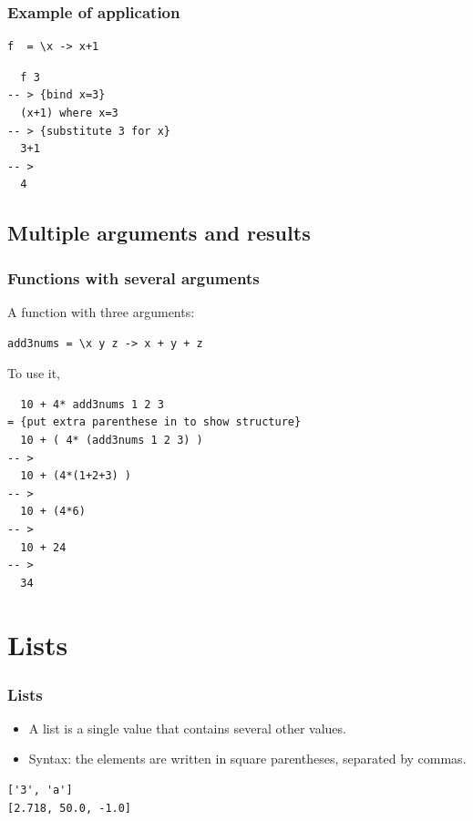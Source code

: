 \documentclass{beamer}
\begin{document}
\begin{frame}[fragile]
\frametitle{Example of application}

\begin{verbatim}
f  = \x -> x+1
\end{verbatim}

\begin{verbatim}
  f 3
-- > {bind x=3}
  (x+1) where x=3
-- > {substitute 3 for x}
  3+1
-- >
  4
\end{verbatim}

\end{frame}

\subsection{Multiple arguments and results}

\begin{frame}[fragile]
\frametitle{Functions with several arguments}

A function with three arguments:

\begin{verbatim}
add3nums = \x y z -> x + y + z
\end{verbatim}

To use it,

\begin{verbatim}
  10 + 4* add3nums 1 2 3
= {put extra parenthese in to show structure}
  10 + ( 4* (add3nums 1 2 3) )
-- >
  10 + (4*(1+2+3) )
-- >
  10 + (4*6)
-- >
  10 + 24
-- >
  34
\end{verbatim}

\end{frame}


\section{Lists}
\begin{frame}[fragile]
\frametitle{Lists}

\begin{itemize}
\item A list is a single value that contains several other values.
\item Syntax: the elements are written in square parentheses,
  separated by commas.
\end{itemize}

\begin{verbatim}
['3', 'a']
[2.718, 50.0, -1.0]
\end{verbatim}

\end{frame}
\end{document}
